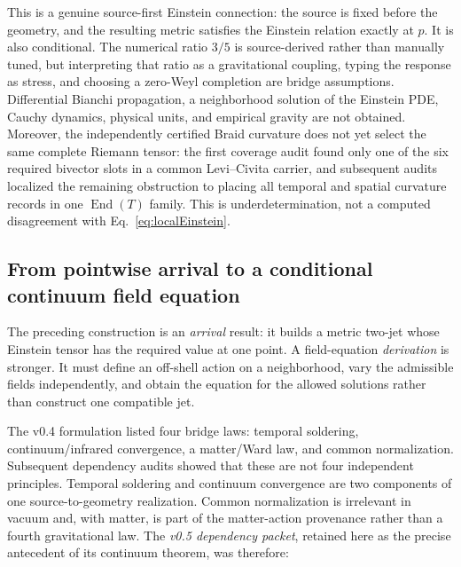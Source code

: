 \documentclass[11pt]{article}
\theoremstyle{definition}
\theoremstyle{remark}
\begin{document}
This is a genuine source-first Einstein connection: the source is fixed before the geometry, and the resulting metric satisfies the Einstein relation exactly at $p$. It is also conditional. The numerical ratio $3/5$ is source-derived rather than manually tuned, but interpreting that ratio as a gravitational coupling, typing the response as stress, and choosing a zero-Weyl completion are bridge assumptions. Differential Bianchi propagation, a neighborhood solution of the Einstein PDE, Cauchy dynamics, physical units, and empirical gravity are not obtained. Moreover, the independently certified Braid curvature does not yet select the same complete Riemann tensor: the first coverage audit found only one of the six required bivector slots in a common Levi--Civita carrier, and subsequent audits localized the remaining obstruction to placing all temporal and spatial curvature records in one $\operatorname{End}(T)$ family. This is underdetermination, not a computed disagreement with Eq.~\eqref{eq:localEinstein}.

\subsection{From pointwise arrival to a conditional continuum field equation}

The preceding construction is an \emph{arrival} result: it builds a metric two-jet whose Einstein tensor has the required value at one point. A field-equation \emph{derivation} is stronger. It must define an off-shell action on a neighborhood, vary the admissible fields independently, and obtain the equation for the allowed solutions rather than construct one compatible jet.

The v0.4 formulation listed four bridge laws: temporal soldering, continuum/infrared convergence, a matter/Ward law, and common normalization. Subsequent dependency audits showed that these are not four independent principles. Temporal soldering and continuum convergence are two components of one source-to-geometry realization. Common normalization is irrelevant in vacuum and, with matter, is part of the matter-action provenance rather than a fourth gravitational law. The \emph{v0.5 dependency packet}, retained here as the precise antecedent of its continuum theorem, was therefore:
\end{document}
